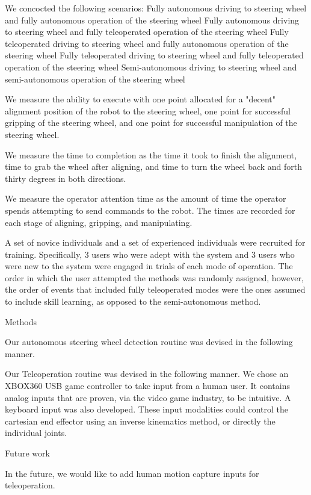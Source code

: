 We concocted the following scenarios:
Fully autonomous driving to steering wheel and fully autonomous operation of the steering wheel
Fully autonomous driving to steering wheel and fully teleoperated operation of the steering wheel
Fully teleoperated driving to steering wheel and fully autonomous operation of the steering wheel
Fully teleoperated driving to steering wheel and fully teleoperated operation of the steering wheel
Semi-autonomous driving to steering wheel and semi-autonomous operation of the steering wheel

We measure the ability to execute with one point allocated for a "decent" alignment position of the robot to the steering wheel, one point for successful gripping of the steering wheel, and one point for successful manipulation of the steering wheel.

We measure the time to completion as the time it took to finish the alignment, time to grab the wheel after aligning, and time to turn the wheel back and forth thirty degrees in both directions.

We measure the operator attention time as the amount of time the operator spends attempting to send commands to the robot.  The times are recorded for each stage of aligning, gripping, and manipulating.

A set of novice individuals and a set of experienced individuals were recruited for training.  Specifically, 3 users who were adept with the system and 3 users who were new to the system were engaged in trials of each mode of operation.  The order in which the user attempted the methods was randomly assigned, however, the order of events that included fully teleoperated modes were the ones assumed to include skill learning, as opposed to the semi-autonomous method.

Methods

Our autonomous steering wheel detection routine was devised in the following manner.

Our Teleoperation routine was devised in the following manner.  We chose an XBOX360 USB game controller to take input from a human user.  It contains analog inputs that are proven, via the video game industry, to be intuitive.  A keyboard input was also developed.  These input modalities could control the cartesian end effector using an inverse kinematics method, or directly the individual joints.

Future work

In the future, we would like to add human motion capture inputs for teleoperation.